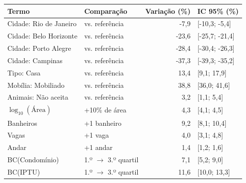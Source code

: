\begin{tabular}{llrl}
\toprule
Termo & Comparação & Variação (\%) & IC 95\% (\%) \\
\midrule
Cidade: Rio de Janeiro & vs. referência & -7,9 & [-10,3; -5,4] \\
Cidade: Belo Horizonte & vs. referência & -23,6 & [-25,7; -21,4] \\
Cidade: Porto Alegre & vs. referência & -28,4 & [-30,4; -26,3] \\
Cidade: Campinas & vs. referência & -37,3 & [-39,3; -35,2] \\
Tipo: Casa & vs. referência & 13,4 & [9,1; 17,9] \\
Mobília: Mobiliado & vs. referência & 38,8 & [36,0; 41,6] \\
Animais: Não aceita & vs. referência & 3,2 & [1,1; 5,4] \\
$\log_{10}(\text{Área})$ & +10\% de área & 4,3 & [4,1; 4,5] \\
Banheiros & +1 banheiro & 9,2 & [8,1; 10,4] \\
Vagas & +1 vaga & 4,0 & [3,1; 4,8] \\
Andar & +1 andar & 1,4 & [1,2; 1,6] \\
BC(Condomínio) & 1.º $\to$ 3.º quartil & 7,1 & [5,2; 9,0] \\
BC(IPTU) & 1.º $\to$ 3.º quartil & 11,6 & [10,0; 13,3] \\
\bottomrule
\end{tabular}
